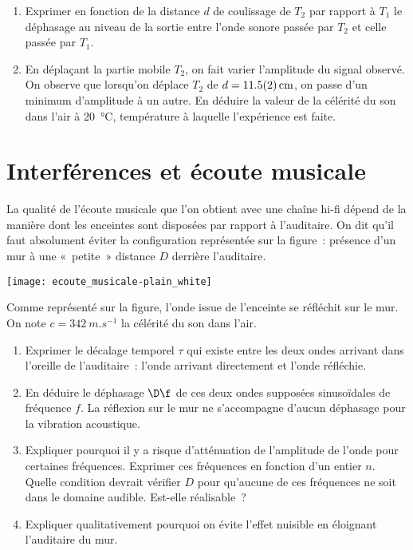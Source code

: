 \documentclass[a4paper, 12pt, final, garamond]{book}
\begin{document}
\begin{enumerate}
    \item Exprimer en fonction de la distance $d$ de coulissage de $T_2$ par
        rapport à $T_1$ le déphasage au niveau de la sortie entre l'onde sonore
        passée par $T_2$ et celle passée par $T_1$.
    \item En déplaçant la partie mobile $T_2$, on fait varier l'amplitude du
        signal observé. On observe que lorsqu'on déplace $T_2$ de $d =
        \SI{11.5\pm0.2}{cm}$, on passe d'un minimum d'amplitude à un autre. En
        déduire la valeur de la célérité du son dans l'air à
        \SI{20}{\degreeCelsius}, température à laquelle l'expérience est faite.
\end{enumerate}

\section{Interférences et écoute musicale}
\begin{minipage}{0.60\linewidth}
    La qualité de l'écoute musicale que l'on obtient avec une chaîne hi-fi
    dépend de la manière dont les enceintes sont disposées par rapport à
    l'auditaire. On dit qu'il faut absolument éviter la configuration représentée
    sur la figure~: présence d'un mur à une «~petite~» distance $D$ derrière
    l'auditaire.
\end{minipage}
\hfill
\begin{minipage}{0.40\linewidth}
    \begin{center}
        \texttt{[image: ecoute\_musicale-plain\_white]}
    \end{center}
\end{minipage}
\bigbreak
Comme représenté sur la figure, l'onde issue de l'enceinte se réfléchit
sur le mur. On note $c = \SI{342}{m.s^{-1}}$ la célérité du son dans l'air.

\begin{enumerate}
    \item Exprimer le décalage temporel $\tau$ qui existe entre les deux ondes
        arrivant dans l'oreille de l'auditaire~: l'onde arrivant directement et
        l'onde réfléchie.
    \item En déduire le déphasage $\D\f$ de ces deux ondes supposées
        sinusoïdales de fréquence $f$. La réflexion sur le mur ne s'accompagne
        d'aucun déphasage pour la vibration acoustique.
    \item Expliquer pourquoi il y a risque d'atténuation de l'amplitude de
        l'onde pour certaines fréquences. Exprimer ces fréquences en fonction
        d'un entier $n$. Quelle condition devrait vérifier $D$ pour qu'aucune de
        ces fréquences ne soit dans le domaine audible. Est-elle réalisable~?
    \item Expliquer qualitativement pourquoi on évite l'effet nuisible en
        éloignant l'auditaire du mur.
\end{enumerate}
\end{document}
